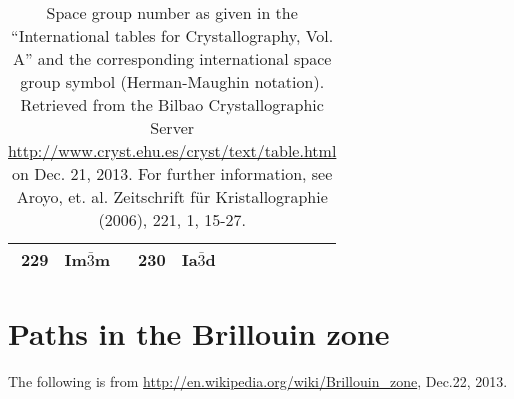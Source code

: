 \documentclass[11pt,a4paper]{report}
\begin{document}
\begin{table}[H]
\begin{center}
\begin{tabular}{||r|l||r|l||r|l||r|l||r|l||}
229    & Im$\bar{3}$m       & 
230    & Ia$\bar{3}$d       \\
\hline
\end{tabular}
\end{center}
\caption{\label{table:spacegroupnumber_b}Space group number as given
  in the ``International tables for Crystallography, Vol. A'' and the
  corresponding international space group symbol (Herman-Maughin
  notation). Retrieved from the Bilbao Crystallographic Server
  \url{http://www.cryst.ehu.es/cryst/text/table.html} on Dec. 21,
  2013.  For further information, see Aroyo, et. al. Zeitschrift f\"ur
  Kristallographie (2006), 221, 1, 15-27.  }
\end{table}

\section{Paths in the Brillouin zone}
The following is from
\url{http://en.wikipedia.org/wiki/Brillouin_zone}, Dec.22, 2013.




\end{document}
